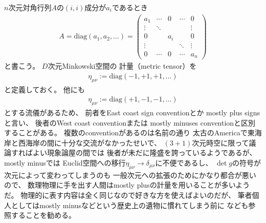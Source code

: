 $n$次元対角行列$A$の$(i,i)$成分が$a_i$であるとき
\begin{align}
    A = \mathrm{diag}(a_1, a_2,\dots)
    =
    \begin{pmatrix}
        a_{1}  & \cdots & 0      & \cdots & 0
        \\
        \vdots & \ddots &        &        & \vdots
        \\
        0      &        & a_{i}  &        & 0
        \\
        \vdots &        &        & \ddots & \vdots
        \\
        0      & \cdots & 0      & \cdots & a_{n}
    \end{pmatrix}
\end{align}
と書こう。
$D$次元Minkowski空間の
計量（metric tensor）を
\begin{align}
    \eta_{\mu\nu}
    :=
    \mathrm{diag}(-1, +1, +1, \dots)
\label{mostly plus minkowski metric}
\end{align}
と定義しておく。
他にも
\begin{align}
    \eta_{\mu\nu}
    :=
    \mathrm{diag}(+1, -1, -1, \dots)
\end{align}
とする流儀があるため、
前者をEast coast sign conventionとか
mostly plus signsと言い、
後者のWest coast conventionまたは
mostly minuses conventionと区別することがある。
複数のconventionがあるのは名前の通り
太古のAmericaで東海岸と西海岸の間に十分な交流がなかったせいで、
$(3+1)$次元時空に限って議論すればよい現象論屋の間では
後者が未だに隆盛を誇っているようであるが、
mostly minusでは
Euclid空間への移行$\eta_{\mu\nu} \to \delta_{\mu\nu}$に不便であるし、
$\det g$の符号が次元によって変わってしまうのも
一般次元への拡張のためにかなり都合が悪いので、
数理物理に手を出す人間はmostly plusの計量を用いることが多いようだ。
物理的に表す内容は全く同じなので好きな方を使えばよいのだが、
筆者個人としてはmostly minusなどという歴史上の遺物に慣れてしまう前に
\cite{The West Coast Metric is the Wrong One}
なども参照することを勧める。
